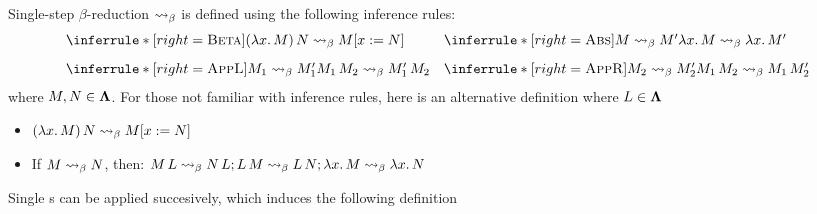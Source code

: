 \documentclass[12pt]{book}
\newcommand{\subst}[2]{[#1 := #2]}    %
\newcommand{\step}{\curly} %
\newcommand{\lam}[2]{\lambda #1.\,#2} %
\begin{document}
\begin{definition} Single-step $\beta$-reduction $\step$ is defined using the following inference rules:
\[
\begin{array}{@{}l@{\quad}l@{}}
  \inferrule*[right=\textsc{Beta}]
    { }
    { (\lam{x}{M})\,N \step M\subst{x}{N} }
  &
  \inferrule*[right=\textsc{Abs}]
    { M \step M' }
    { \lam{x}{M} \step \lam{x}{M'} } \\[2ex]
  \inferrule*[right=\textsc{AppL}]
    { M_1 \step M_1' }
    { M_1\,M_2 \step M_1'\,M_2 }
  &
  \inferrule*[right=\textsc{AppR}]
    { M_2 \step M_2' }
    { M_1\,M_2 \step M_1\,M_2' }
\end{array}
\]
where \( M, N \in \mathbf{\Lambda} \). For those not familiar with inference rules, here is an alternative definition where \( L \in \mathbf{\Lambda} \)
\begin{itemize}
\item \( (\lam{x}{M})\,N \step M\subst{x}{N} \)
\item If $M \step N$, then: \( M\,L \step N\,L; L\,M \step L\,N; \lam{x}{M} \step \lam{x}{N} \)
\end{itemize}
\end{definition}

Single \bred s can be applied succesively, which induces the following definition
\end{document}
